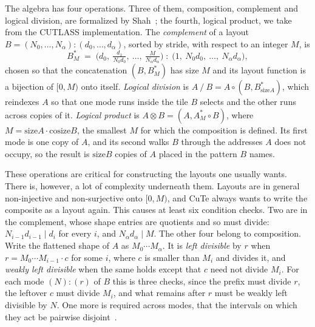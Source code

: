 \documentclass[11pt]{article}
\theoremstyle{definition}
\newcommand{\size}{\mathrm{size}}
\newcommand{\cosize}{\mathrm{cosize}}
\begin{document}
The algebra has four operations. Three of them, composition, complement and
logical division, are formalized by Shah~\cite{shah}; the fourth, logical
product, we take from the CUTLASS implementation. The \emph{complement} of a
layout
$B = (N_0,\dots,N_\alpha){:}(d_0,\dots,d_\alpha)$, sorted by stride, with
respect to an integer $M$, is
\[
B^{*}_{M} \;=\;
\Big(d_0,\ \tfrac{d_1}{N_0 d_0},\ \dots,\ \tfrac{M}{N_\alpha d_\alpha}\Big)
\;{:}\;
\Big(1,\ N_0 d_0,\ \dots,\ N_\alpha d_\alpha\Big),
\]
chosen so that the concatenation $(B, B^{*}_{M})$ has size $M$ and its layout
function is a bijection of $[0,M)$ onto itself. \emph{Logical division} is
$A \mathbin{/} B = A \circ (B, B^{*}_{\size A})$, which reindexes $A$ so that
one mode runs inside the tile $B$ selects and the other runs across copies of
it. \emph{Logical product} is $A \otimes B = (A, A^{*}_{M} \circ B)$, where
$M = \size A \cdot \cosize B$, the smallest $M$ for which the composition is
defined. Its
first mode is one copy of $A$, and its second walks $B$ through the addresses
$A$ does not occupy, so the result is $\size B$ copies of $A$ placed in the
pattern $B$ names.

These operations are critical for constructing the layouts one usually wants.
There is, however, a lot of complexity underneath them. Layouts are in general
non-injective and non-surjective onto $[0,M)$, and CuTe always wants to write
the composite as a layout again. This causes at least six condition checks. Two are in the complement, whose
shape entries are quotients and so must divide: $N_{i-1}d_{i-1} \mid d_i$ for
every $i$, and $N_\alpha d_\alpha \mid M$. The other four belong to
composition. Write the flattened shape of $A$ as $M_0 \cdots M_\alpha$. It is \emph{left divisible} by $r$
when $r = M_0 \cdots M_{i-1} \cdot c$ for some $i$, where $c$ is smaller than
$M_i$ and divides it, and \emph{weakly left divisible} when the same holds
except that $c$ need not divide $M_i$. For each mode $(N){:}(r)$ of $B$ this is
three checks, since the prefix must divide $r$, the leftover $c$ must divide
$M_i$, and what remains after $r$ must be weakly left divisible by $N$. One
more is required across modes, that the intervals on which they act be pairwise
disjoint~\cite{shah}.
\end{document}
